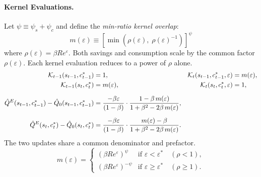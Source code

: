
\paragraph{Kernel Evaluations.}
Let $\psi \equiv \psi_s + \psi_c$ and define the \textit{min-ratio kernel overlap}:
\begin{equation}
m(\varepsilon) \equiv \left[\min\!\left(\rho(\varepsilon),\; \rho(\varepsilon)^{-1}\right)\right]^{\psi}
\end{equation}
where $\rho(\varepsilon) = \beta R e^\varepsilon$. Both savings and consumption scale by the common factor $\rho(\varepsilon)$. Each kernel evaluation reduces to a power of $\rho$ alone.
\begin{align}
\mathcal{K}_{t-1}(s_{t-1}, c_{t-1}^*) &= 1, &
\mathcal{K}_t(s_{t-1}, c_{t-1}^*, \varepsilon) &= m(\varepsilon), \notag\\
\mathcal{K}_{t-1}(s_t, c_t^*) &= m(\varepsilon), &
\mathcal{K}_t(s_t, c_t^*, \varepsilon) &= 1, \notag\\[6pt]
%
\hat{Q}^E(s_{t-1}, c_{t-1}^*) - \hat{Q}_0(s_{t-1}, c_{t-1}^*)
&= \frac{-\beta\varepsilon}{(1-\beta)}
\cdot \frac{1 - \beta\, m(\varepsilon)}{1 + \beta^2 - 2\beta\, m(\varepsilon)}, \\[6pt]
%
\hat{Q}^E(s_t, c_t^*) - \hat{Q}_0(s_t, c_t^*)
&= \frac{-\beta\varepsilon}{(1-\beta)}
\cdot \frac{m(\varepsilon) - \beta}{1 + \beta^2 - 2\beta\, m(\varepsilon)}.
\end{align}
The two updates share a common denominator and prefactor. 
\begin{equation}
m(\varepsilon) =
\begin{cases}
(\beta R e^\varepsilon)^{\psi} & \text{if } \varepsilon < \varepsilon^* \quad (\rho < 1), \\[4pt]
(\beta R e^\varepsilon)^{-\psi} & \text{if } \varepsilon \geq \varepsilon^* \quad (\rho \geq 1).
\end{cases}
\end{equation}






